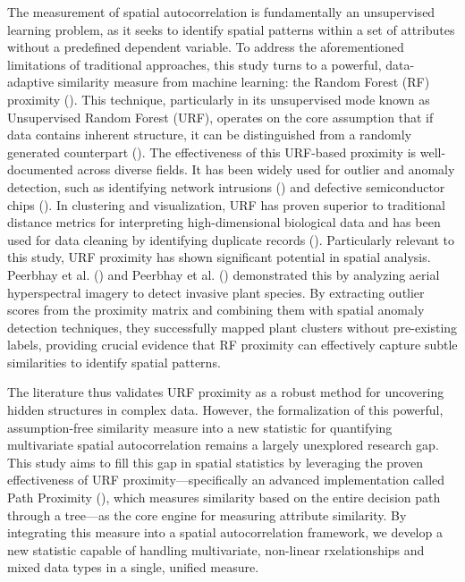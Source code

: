 \documentclass[
  a4paper,
  12pt]{article}
\begin{document}
The measurement of spatial autocorrelation is fundamentally an
unsupervised learning problem, as it seeks to identify spatial patterns
within a set of attributes without a predefined dependent variable. To
address the aforementioned limitations of traditional approaches, this
study turns to a powerful, data-adaptive similarity measure from machine
learning: the Random Forest (RF) proximity
(). This technique, particularly
in its unsupervised mode known as Unsupervised Random Forest (URF),
operates on the core assumption that if data contains inherent
structure, it can be distinguished from a randomly generated counterpart
(). The effectiveness of
this URF-based proximity is well-documented across diverse fields. It
has been widely used for outlier and anomaly detection, such as
identifying network intrusions () and defective semiconductor chips (). In clustering and visualization, URF has proven superior to
traditional distance metrics for interpreting high-dimensional
biological data and has been used for data cleaning by identifying
duplicate records ().
Particularly relevant to this study, URF proximity has shown significant
potential in spatial analysis. Peerbhay et al.
() and Peerbhay et al.
() demonstrated this by analyzing
aerial hyperspectral imagery to detect invasive plant species. By
extracting outlier scores from the proximity matrix and combining them
with spatial anomaly detection techniques, they successfully mapped
plant clusters without pre-existing labels, providing crucial evidence
that RF proximity can effectively capture subtle similarities to
identify spatial patterns.

The literature thus validates URF proximity as a robust method for
uncovering hidden structures in complex data. However, the formalization
of this powerful, assumption-free similarity measure into a new
statistic for quantifying multivariate spatial autocorrelation remains a
largely unexplored research gap. This study aims to fill this gap in
spatial statistics by leveraging the proven effectiveness of URF
proximity---specifically an advanced implementation called Path
Proximity (), which
measures similarity based on the entire decision path through a
tree---as the core engine for measuring attribute similarity. By
integrating this measure into a spatial autocorrelation framework, we
develop a new statistic capable of handling multivariate, non-linear
rxelationships and mixed data types in a single, unified measure.
\end{document}
